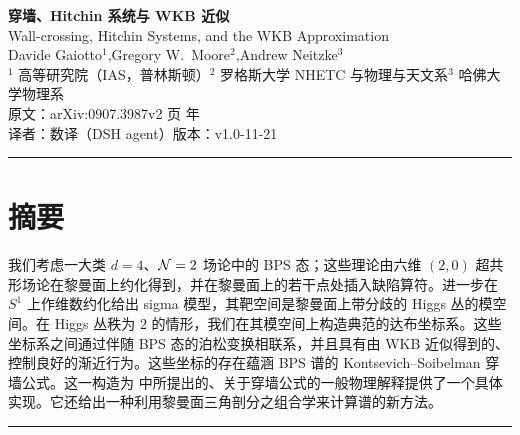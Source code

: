 \documentclass[UTF8,a4paper,12pt,fontset=fandol,scheme=chinese]{ctexart}
\begin{document}
\pagestyle{plain}
\thispagestyle{empty}

\begin{center}

{\LARGE\bfseries 穿墙、Hitchin 系统与 WKB 近似}\\[0.35em]
{\large Wall-crossing, Hitchin Systems, and the WKB Approximation}\\[1.0em]

{\large Davide Gaiotto$^{1}$,\quad Gregory W.~Moore$^{2}$,\quad Andrew Neitzke$^{3}$}\\[0.5em]
{\small $^{1}$ 高等研究院（IAS，普林斯顿）\quad $^{2}$ 罗格斯大学 NHETC 与物理与天文系\quad $^{3}$ 哈佛大学物理系}\\[0.6em]

{\small 原文：arXiv:0907.3987v2 页 年}\\[0.3em]
{\small 译者：数译（DSH agent）\quad 版本：v1.0-11-21}

\end{center}

\vspace{1.2em}
\begin{center}\rule{0.85\textwidth}{0.4pt}\end{center}
\vspace{0.4em}

\section*{摘要}

我们考虑一大类 $d=4$、$\mathcal{N}=2$ 场论中的 BPS 态；这些理论由六维 $(2,0)$ 超共形场论在黎曼面上约化得到，并在黎曼面上的若干点处插入缺陷算符。进一步在 $S^1$ 上作维数约化给出 sigma 模型，其靶空间是黎曼面上带分歧的 Higgs 丛的模空间。在 Higgs 丛秩为 $2$ 的情形，我们在其模空间上构造典范的达布坐标系。这些坐标系之间通过伴随 BPS 态的泊松变换相联系，并且具有由 WKB 近似得到的、控制良好的渐近行为。这些坐标的存在蕴涵 BPS 谱的 Kontsevich–Soibelman 穿墙公式。这一构造为 \cite{Gaiotto:2008cd} 中所提出的、关于穿墙公式的一般物理解释提供了一个具体实现。它还给出一种利用黎曼面三角剖分之组合学来计算谱的新方法。

\vspace{0.6em}
\begin{center}\rule{0.85\textwidth}{0.4pt}\end{center}
\end{document}
